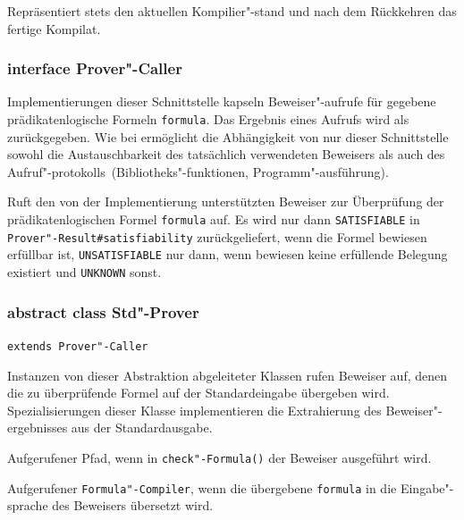 \begin{description}%

    Repräsentiert stets den aktuellen Kompilier"-stand und nach dem
    Rückkehren das fertige Kompilat.%

\end{description}%

\subsubsection{interface Prover"-Caller}%

Implementierungen dieser Schnittstelle kapseln Beweiser"-aufrufe für
gegebene prädikatenlogische Formeln \texttt{formula}. Das Ergebnis
eines Aufrufs wird als  zurückgegeben. Wie bei
 ermöglicht die Abhängigkeit von nur dieser
Schnittstelle sowohl die Austauschbarkeit des tatsächlich verwendeten
Beweisers als auch des Aufruf"-protokolls~(Bibliotheks"-funktionen,
Programm"-ausführung).%

\begin{description}%

    Ruft den von der Implementierung unterstützten Beweiser zur Überprüfung der
    prädikatenlogischen Formel \texttt{formula} auf. Es wird nur dann
    \texttt{SATISFIABLE} in \texttt{Prover"-Result\#satisfiability}
    zurückgeliefert, wenn die Formel bewiesen erfüllbar ist,
    \texttt{UNSATISFIABLE} nur dann, wenn bewiesen keine erfüllende
    Belegung existiert und \texttt{UNKNOWN} sonst.

\end{description}%

\subsubsection{abstract class Std"-Prover}%

\texttt{extends Prover"-Caller}%

Instanzen von dieser Abstraktion abgeleiteter Klassen rufen Beweiser
auf, denen die zu überprüfende Formel auf der Standardeingabe
übergeben wird. Spezialisierungen dieser Klasse implementieren die
Extrahierung des Beweiser"-ergebnisses aus der Standardausgabe.%

\begin{description}%

    Aufgerufener Pfad, wenn in \texttt{check"-Formula()} der Beweiser
    ausgeführt wird.%


    Aufgerufener \texttt{Formula"-Compiler}, wenn die übergebene
    \texttt{formula} in die Eingabe"-sprache des Beweisers übersetzt
    wird.%

\end{description}%


